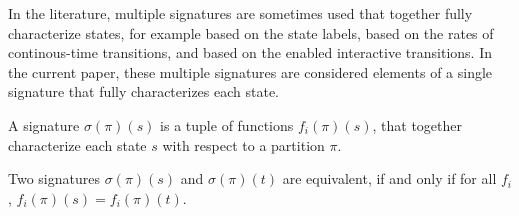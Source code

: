 
In the literature, multiple signatures are sometimes used that together fully characterize states, for example based on the state labels, based on the rates of continous-time transitions, and based on the enabled interactive transitions.
%
%
In the current paper, these multiple signatures are considered elements of a single signature that fully characterizes each state.

\begin{definition}
A signature $\sigma(\pi)(s)$ is a tuple of functions $f_i(\pi)(s)$, that together characterize each state $s$ with respect to a partition $\pi$.
\end{definition}

Two signatures $\sigma(\pi)(s)$ and $\sigma(\pi)(t)$ are equivalent, if and only if for all $f_i$, $f_i(\pi)(s)=f_i(\pi)(t)$.
%
%






